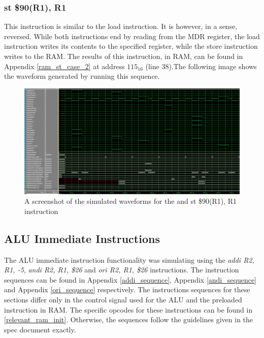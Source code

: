 \documentclass{article}
\begin{document}
        \subsubsection{st \$90(R1), R1}
            This instruction is similar to the load instruction. It is however, in a sense, reversed. While both instructions end by reading from the MDR register, the load instruction writes its contents to the specified register, while the store instruction writes to the RAM. The results of this instruction, in RAM, can be found in Appendix \ref{ram_st_case_2} at address $115_{16}$ (line 38).The following image shows the waveform generated by running this sequence. 

            \begin{figure}[h!]
                \begin{center}
                    \includegraphics[width=15cm]{st_case_1_wave.png}
                    \caption{A screenshot of the simulated waveforms for the and st \$90(R1), R1 instruction}
                \end{center}
            \end{figure}
            

    \subsection{ALU Immediate Instructions}
        The ALU immediate instruction functionality was simulating using the \emph{addi R2, R1, -5}, \emph{andi R2, R1, \$26} and \emph{ori R2, R1, \$26} instructions. The instruction sequences can be found in Appendix \ref{addi_sequence}, Appendix \ref{andi_sequence} and Appendix \ref{ori_sequence} respectively. The instructions sequences for these sections differ only in the control signal used for the ALU and the preloaded instruction in RAM. The specific opcodes for these instructions can be found in \ref{relevant_ram_init}. Otherwise, the sequences follow the guidelines given in the spec document exactly.
\end{document}
